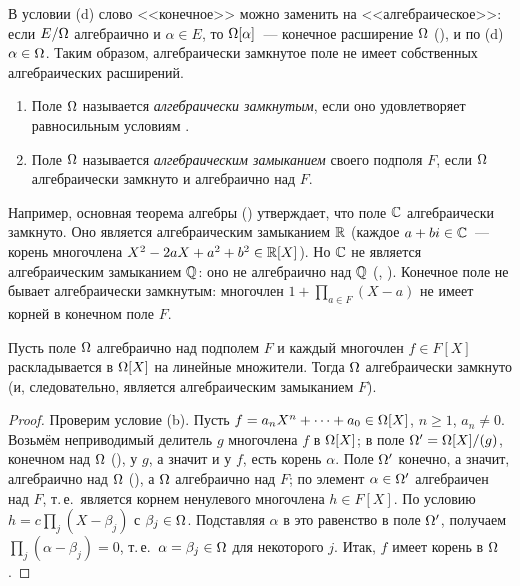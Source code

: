 В условии (d) слово <<конечное>> можно заменить на <<алгебраическое>>: если $E/\Omega$ алгебраично и $\alpha\in E$, то
$\Omega[\alpha]$~--- конечное расширение $\Omega$ (), и по (d) $\alpha\in\Omega$. Таким образом, алгебраически замкнутое
поле не имеет собственных алгебраических расширений.

\begin{definition}[1.44]
\begin{enumerate}[label=(\alph*),leftmargin=*]
\item Поле $\Omega$ называется \emph{алгебраически замкнутым}, если оно удовлетворяет равносильным условиям .
\item Поле $\Omega$ называется \emph{алгебраическим замыканием} своего подполя $F$, если $\Omega$ алгебраически замкнуто и
алгебраично над $F$.
\end{enumerate}
\end{definition}

Например, основная теорема алгебры () утверждает, что поле $\mathbb C$ алгебраически замкнуто. Оно является
алгебраическим замыканием $\mathbb R$ (каждое $a+bi\in\mathbb C$~--- корень многочлена $X^2-2aX+a^2+b^2\in\mathbb R[X]$). Но $\mathbb C$ не является
алгебраическим замыканием $\mathbb Q$: оно не алгебраично над $\mathbb Q$ (, ). Конечное поле не бывает алгебраически
замкнутым: многочлен $1+\prod_{a\in F}(X-a)$ не имеет корней в конечном поле $F$.

\begin{proposition}[1.45]
Пусть поле $\Omega$ алгебраично над подполем $F$ и каждый многочлен $f\in F[X]$ раскладывается в $\Omega[X]$ на линейные
множители. Тогда $\Omega$ алгебраически замкнуто (и, следовательно, является алгебраическим замыканием $F$).
\end{proposition}

\begin{proof}
Проверим условие (b). Пусть $f=a_nX^n+\dots+a_0\in\Omega[X]$, $n\ge1$, $a_n\ne0$. Возьмём неприводимый делитель $g$
многочлена $f$ в $\Omega[X]$; в поле $\Omega'=\Omega[X]/(g)$, конечном над $\Omega$ (), у $g$, а значит и у $f$, есть корень
$\alpha$. Поле $\Omega'$ конечно, а значит, алгебраично над $\Omega$ (), а $\Omega$ алгебраично над $F$; по 
элемент $\alpha\in\Omega'$ алгебраичен над $F$, т.\,е.\ является корнем ненулевого многочлена $h\in F[X]$. По условию
$h=c\prod_j(X-\beta_j)$ с $\beta_j\in\Omega$.
Подставляя $\alpha$ в это равенство в поле $\Omega'$, получаем $\prod_j(\alpha-\beta_j)=0$, т.\,е.\ $\alpha=\beta_j\in\Omega$ для
некоторого $j$. Итак, $f$ имеет корень в $\Omega$.
\end{proof}


